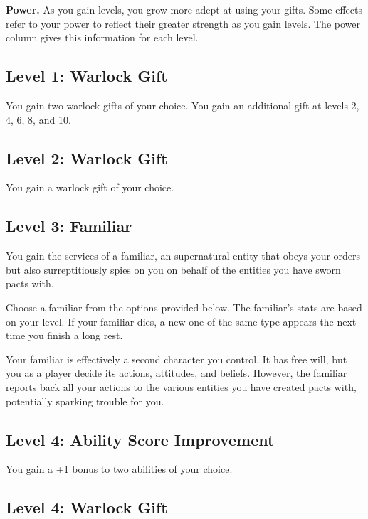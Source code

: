 \documentclass[12pt,letterpaper,twocolumn,openany,nodeprecatedcode,bg=none]{dndbook}
\begin{document}
\textbf{Power.} As you gain levels, you grow more adept at using your
gifts. Some effects refer to your power to reflect their greater
strength as you gain levels. The power column gives this information for
each level.

\subsection{Level 1: Warlock Gift}\label{level-1-warlock-gift}

You gain two warlock gifts of your choice. You gain an additional gift
at levels 2, 4, 6, 8, and 10.

\subsection{Level 2: Warlock Gift}\label{level-2-warlock-gift}

You gain a warlock gift of your choice.

\subsection{Level 3: Familiar}\label{level-3-familiar}

You gain the services of a familiar, an supernatural entity that obeys
your orders but also surreptitiously spies on you on behalf of the
entities you have sworn pacts with.

Choose a familiar from the options provided below. The familiar's stats
are based on your level. If your familiar dies, a new one of the same
type appears the next time you finish a long rest.

Your familiar is effectively a second character you control. It has free
will, but you as a player decide its actions, attitudes, and beliefs.
However, the familiar reports back all your actions to the various
entities you have created pacts with, potentially sparking trouble for
you.

\subsection{Level 4: Ability Score
Improvement}\label{level-4-ability-score-improvement}

You gain a +1 bonus to two abilities of your choice.

\subsection{Level 4: Warlock Gift}\label{level-4-warlock-gift}
\end{document}
